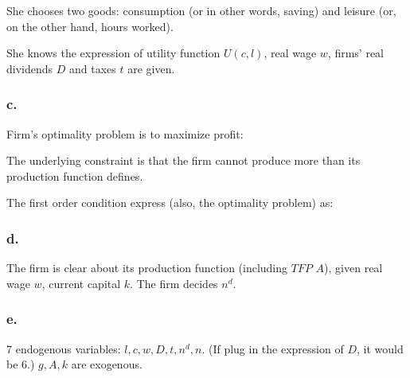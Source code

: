 \documentclass{article}
\begin{document}
She chooses two goods: consumption (or in other words, saving) and leisure (or, on the other hand, hours worked).

She knows the expression of utility function $U\left(c,l\right)$, real wage $w$, firms' real dividends $D$ and taxes $t$ are given.

\subsubsection*{\textrm{c.}}

Firm's optimality problem is to maximize profit:


The underlying constraint is that the firm cannot produce more than its production function defines.

The first order condition express (also, the optimality problem) as:


\subsubsection*{\textrm{d.}}

The firm is clear about its production function (including $TFP$ $A$), given real wage $w$, current capital $k$. The firm decides $n^{d}$.

\subsubsection*{\textrm{e.}}

7 endogenous variables: $l,c,w,D,t,n^{d}, n$. (If plug in the expression of $D$, it would be 6.) $g, A, k$ are exogenous.
\end{document}
